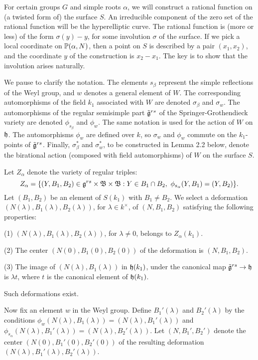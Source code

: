 For certain groups $G$ and simple roots $\alpha$,  we will
construct a rational function on (a twisted
form of) the surface $S$.
An irreducible component of the zero set of the rational
function
will be the hyperelliptic
curve.  
The rational function
is (more or less) of the form $\sigma(y)-y$, for
some involution $\sigma$ of the surface.
If we pick a local coordinate on $\P(\alpha,N)$, 
then a point on $S$
is described by a pair $(x_1,x_2)$, and the coordinate
$y$ of the construction is $x_2-x_1$.
The key is to show
that the involution arises naturally.

We pause to clarify the notation.  The elements
$s_\beta$ represent the simple reflections of the Weyl group, and $w$
denotes a general element of $W$.  The corresponding
automorphisms of the field $k_1$
associated with $W$ are denoted $\sigma_\beta$ and $\sigma_w$.  The
automorphisms of the regular semisimple part $\tilde \g^{rs}$
of the Springer-Grothendieck
variety are denoted $\phi_{s_\beta}$ and $\phi_w$.  The same notation
is used for the action of $W$ on $\h$.
The automorphisms $\phi_w$ are defined over
$k$, so $\sigma_w$ and $\phi_w$ commute on the $k_1$-points of 
$\tilde \g^{rs}$.
 Finally, $\sigma^*_\beta$ and $\sigma^*_w$,
to be constructed in Lemma 2.2 below,
denote the birational action (composed with field automorphisms) of
$W$ on the surface $S$.  


Let $Z_\alpha$ denote the variety of regular triples:
$$Z_\alpha = \{(Y,B_1,B_2)\in \g^{rs}\times \B\times\B :
   Y\in B_1\cap B_2,\ \phi_{s_\alpha}(Y,B_1) = (Y,B_2)\}.
$$
Let $(B_1,B_2)$ be an element of $S(k_1)$ with $B_1\ne B_2$.
We select a 
deformation $(N(\lambda),B_1(\lambda),B_2(\lambda))$, 
for $\lambda\in k^\times$, of $(N,B_1,B_2)$ satisfying
the following properties:
\item{(1)} $(N(\lambda),B_1(\lambda),B_2(\lambda))$, for $\lambda\ne0$,
belongs to $Z_\alpha(k_1)$.
\item{(2)} The center $(N(0),B_1(0),B_2(0))$ of the deformation is $(N,B_1,B_2)$.
\item{(3)} The image of $(N(\lambda),B_1(\lambda))$ in $\h(k_1)$, under the
canonical map $\tilde \g^{rs}\to\h$ is $\lambda t$, where $t$ is the
canonical element of $\h(k_1)$.
\par
\noindent
Such deformations exist.

Now fix an element $w$ in the Weyl group.  Define $B_1'(\lambda)$ and
$B_2'(\lambda)$ by the conditions $\phi_w(N(\lambda),B_1(\lambda)) =
(N(\lambda),B_1'(\lambda))$ and $\phi_{s_\alpha}(N(\lambda),B_1'(\lambda))=
(N(\lambda),B_2'(\lambda))$. Let $(N,B_1',B_2')$ denote the center
$(N(0),B_1'(0),B_2'(0))$ of the resulting deformation 
$(N(\lambda),B_1'(\lambda),B_2'(\lambda))$.

